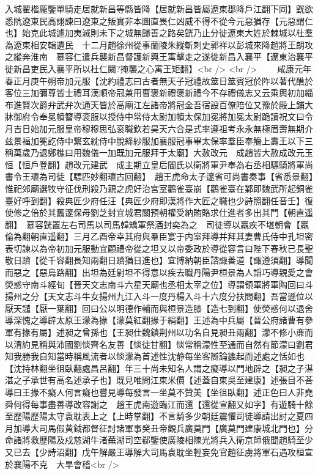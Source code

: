入城翟楷龎鑒單騎走居就新昌等縣皆降【居就新昌皆屬遼東郡降戶江翻下同】皝欲悉阬遼東民高詡諫曰遼東之叛實非本圖直畏仁凶威不得不從今元惡猶存【元惡謂仁也】始克此城遽加夷滅則未下之城無歸善之路矣皝乃止分徙遼東大姓於棘城以杜羣為遼東相安輯遺民　十二月趙徐州從事蘭陵朱縱斬刺史郭祥以彭城來降趙將王朗攻之縱奔淮南　慕容仁遣兵襲新昌督護新興王㝢擊走之遂徙新昌入襄平【遼東治襄平徙新昌吏民入襄平所以杜仁闚?掩襲之心㝢王矩翻】<br />
<br />
　　咸康元年春正月庚午朔帝加元服【沈約禮志曰古者無天子冠禮故筮日筮賓冠於阼以著代醮於客位三加彌尊皆士禮耳漢順帝冠兼用曹褒新禮褒新禮今不存禮儀志又云乘輿初加緇布進賢次爵弁武弁次通天皆於高廟江左諸帝將冠金吾宿設百僚陪位又豫於殿上鋪大牀御府令奉冕幘簪導衮服以授侍中常侍太尉加幘太保加冕將加冕太尉跪讀祝文曰令月吉日始加元服皇帝穆穆思弘衮職欽若昊天六合是式率遵祖考永永無極眉壽無期介兹景福加冕訖侍中繋玄紞侍中脫絳紗服加襄服冠事畢太保率羣臣奉觴上壽王以下三稱萬歲乃退鄭樵曰用魏儀一加既加元服拜于太廟】大赦改元　成趙皆大赦成改元玉恒【恒戶登翻】趙改元建武　成主期立皇后閻氏以衛將軍尹奉為右丞相驃騎將軍尚書令王瓌為司徒【驃匹妙翻瓌古回翻】　趙王虎命太子邃省可尚書奏事【省悉景翻】惟祀郊廟選牧守征伐刑殺乃親之虎好治宮室鸛雀臺崩【鸛雀臺在鄴即魏武所起銅雀臺好呼到翻】殺典匠少府任汪【典匠少府即漢將作大匠之職也少詩照翻任音壬】復使修之倍於其舊邃保母劉芝封宜城君關預朝權受納賄賂求仕進者多出其門【朝直遥翻】　慕容皝置左右司馬以司馬韓矯軍祭酒封奕為之　司徒導以羸疾不堪朝會【羸倫為翻朝直遥翻】三月乙酉帝幸其府與羣臣宴于内室拜導并拜其妻曹氏侍中孔坦密表切諫以為帝初加元服動宜顧禮帝從之坦又以帝委政於導從容言曰陛下春秋已長聖敬日躋【從千容翻長知兩翻日躋猶日進也】宜博納朝臣諮諏善道【諏遵須翻】導聞而惡之【惡烏路翻】出坦為廷尉坦不得意以疾去職丹陽尹桓景為人謟巧導親愛之會熒惑守南斗經旬【晉天文志南斗六星天廟也丞相太宰之位】導謂領軍將軍陶回曰斗揚州之分【天文志斗牛女揚州九江入斗一度丹楊入斗十六度分扶問翻】吾當遜位以厭天譴【厭一葉翻】回曰公以明德作輔而與桓景造膝【造七到翻】使熒惑何以退舍導深愧之導辟太原王濛為掾【濛莫紅翻掾于絹翻】王述為中兵屬【晉公府諸曹有參軍有掾有屬】述昶之曾孫也【王昶仕魏鎮荆州以功名自見昶丑兩翻】濛不修小亷而以清約見稱與沛國劉惔齊名友善【惔徒甘翻】惔常稱濛性至通而自然有節濛曰劉君知我勝我自知當時稱風流者以惔濛為首述性沈静每坐客辯論蠭起而述處之恬如也【沈持林翻坐徂臥翻處昌呂翻】年三十尚未知名人謂之癡導以門地辟之【昶之子湛湛之子承世有高名述承子也】既見唯問江東米價【述蓋自東吳至建康】述張目不荅導曰王掾不癡人何言癡也嘗見導每發言一坐莫不贊美【坐徂臥翻】述正色曰人非堯舜何得每事盡善導改容謝之　趙王虎南遊臨江而還【還從宣翻又如字】有遊騎十餘至歷陽歷陽太守袁耽表上之【上時掌翻】不言騎多少朝廷震懼司徒導請出討之夏四月加導大司馬假黄鉞都督征討諸軍事癸丑帝觀兵廣莫門【廣莫門建康城北門也】分命諸將救歷陽及戍慈湖牛渚蕪湖司空郗鑒使廣陵相陳光將兵入衛京師俄聞趙騎至少又已去【少詩沼翻】戊午解嚴王導解大司馬袁耽坐輕妄免官趙征虜將軍石遇攻桓宣於襄陽不克　大旱會稽<br />
